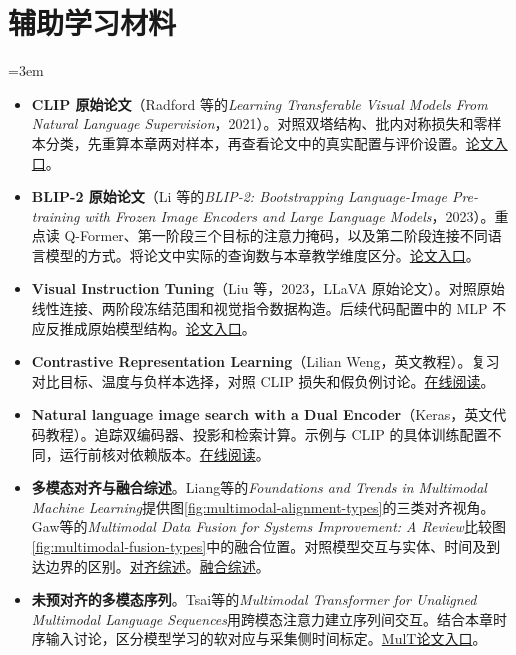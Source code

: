 \section*{辅助学习材料}
\begingroup
\small
\emergencystretch=3em
\begin{itemize}[leftmargin=*]
\item \textbf{CLIP 原始论文}（Radford 等的\textit{Learning Transferable Visual Models From Natural Language Supervision}，2021）。对照双塔结构、批内对称损失和零样本分类，先重算本章两对样本，再查看论文中的真实配置与评价设置。\href{https://arxiv.org/abs/2103.00020v1}{论文入口}。
\item \textbf{BLIP-2 原始论文}（Li 等的\textit{BLIP-2: Bootstrapping Language-Image Pre-training with Frozen Image Encoders and Large Language Models}，2023）。重点读 Q-Former、第一阶段三个目标的注意力掩码，以及第二阶段连接不同语言模型的方式。将论文中实际的查询数与本章教学维度区分。\href{https://arxiv.org/abs/2301.12597v3}{论文入口}。
\item \textbf{Visual Instruction Tuning}（Liu 等，2023，LLaVA 原始论文）。对照原始线性连接、两阶段冻结范围和视觉指令数据构造。后续代码配置中的 MLP 不应反推成原始模型结构。\href{https://arxiv.org/abs/2304.08485v2}{论文入口}。
\item \textbf{Contrastive Representation Learning}（Lilian Weng，英文教程）。复习对比目标、温度与负样本选择，对照 CLIP 损失和假负例讨论。\href{https://lilianweng.github.io/posts/2021-05-31-contrastive/}{在线阅读}。
\item \textbf{Natural language image search with a Dual Encoder}（Keras，英文代码教程）。追踪双编码器、投影和检索计算。示例与 CLIP 的具体训练配置不同，运行前核对依赖版本。\href{https://keras.io/examples/vision/nl\_image\_search/}{在线阅读}。
\item \textbf{多模态对齐与融合综述}。Liang等的\textit{Foundations and Trends in Multimodal Machine Learning}提供图\ref{fig:multimodal-alignment-types}的三类对齐视角。Gaw等的\textit{Multimodal Data Fusion for Systems Improvement: A Review}比较图\ref{fig:multimodal-fusion-types}中的融合位置。对照模型交互与实体、时间及到达边界的区别。\href{https://arxiv.org/abs/2209.03430v2}{对齐综述}。\href{https://doi.org/10.1080/24725854.2021.1987593}{融合综述}。
\item \textbf{未预对齐的多模态序列}。Tsai等的\textit{Multimodal Transformer for Unaligned Multimodal Language Sequences}用跨模态注意力建立序列间交互。结合本章时序输入讨论，区分模型学习的软对应与采集侧时间标定。\href{https://aclanthology.org/P19-1656/}{MulT论文入口}。
\end{itemize}
\endgroup
